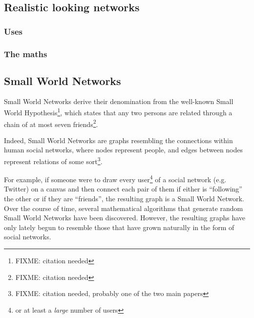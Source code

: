 \documentclass[a4paper,11pt,titlepage]{article}
\begin{document}
\subsection{Realistic looking networks}


\subsubsection{Uses}


\subsubsection{The maths}


\subsection{Small World Networks}

Small World Networks derive their denomination from the well-known
Small World Hypothesis\footnote{FIXME: citation needed}, which states
that any two persons are related through a chain of at most seven
friends\footnote{FIXME: citation needed}.

Indeed, Small World Networks are graphs resembling the connections
within human social networks, where nodes represent people, and edges
between nodes represent relations of some sort\footnote{FIXME:
  citation needed, probably one of the two main papers}.

For example, if someone were to draw every user\footnote{or at least a
  \emph{large} number of users} of a social network (e.g. Twitter) on
a canvas and then connect each pair of them if either is ``following''
the other or if they are ``friends'', the resulting graph is a Small
World Network. Over the course of time, several mathematical
algorithms that generate random Small World Networks have been
discovered. However, the resulting graphs have only lately begun to
resemble those that have grown naturally in the form of social
networks.
\end{document}
